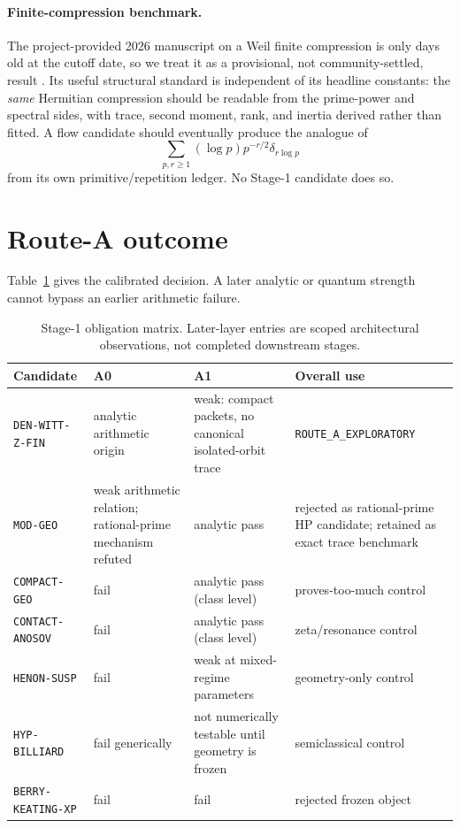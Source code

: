 \documentclass[11pt]{article}
\theoremstyle{definition}
\theoremstyle{remark}
\begin{document}
\paragraph{Finite-compression benchmark.}
The project-provided 2026 manuscript on a Weil finite compression is only days
old at the cutoff date, so we treat it as a provisional, not community-settled,
result \citep{Claude2026}.  Its useful structural standard is independent of
its headline constants: the \emph{same} Hermitian compression should be
readable from the prime-power and spectral sides, with trace, second moment,
rank, and inertia derived rather than fitted.  A flow candidate should
eventually produce the analogue of
\[
 \sum_{p,r\ge1}(\log p)p^{-r/2}\delta_{r\log p}
\]
from its own primitive/repetition ledger.  No Stage-1 candidate does so.

\section{Route-A outcome}

Table~\ref{tab:outcome} gives the calibrated decision.  A later analytic or
quantum strength cannot bypass an earlier arithmetic failure.

\begin{table}[ht]
\centering
\caption{Stage-1 obligation matrix.  Later-layer entries are scoped
architectural observations, not completed downstream stages.}
\label{tab:outcome}
\small
\begin{tabular}{p{}p{}p{}p{}}
\toprule
Candidate & A0 & A1 & Overall use\\
\midrule
\texttt{DEN-WITT-Z-FIN} & analytic arithmetic origin & weak: compact packets, no canonical isolated-orbit trace & \texttt{ROUTE\_A\_EXPLORATORY}\\
\texttt{MOD-GEO} & weak arithmetic relation; rational-prime mechanism refuted & analytic pass & rejected as rational-prime HP candidate; retained as exact trace benchmark\\
\texttt{COMPACT-GEO} & fail & analytic pass (class level) & proves-too-much control\\
\texttt{CONTACT-ANOSOV} & fail & analytic pass (class level) & zeta/resonance control\\
\texttt{HENON-SUSP} & fail & weak at mixed-regime parameters & geometry-only control\\
\texttt{HYP-BILLIARD} & fail generically & not numerically testable until geometry is frozen & semiclassical control\\
\texttt{BERRY-KEATING-XP} & fail & fail & rejected frozen object\\
\bottomrule
\end{tabular}
\end{table}
\end{document}
